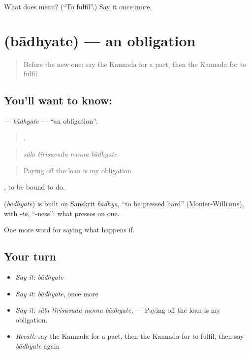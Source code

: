 \begin{tcolorbox}[breakable,colback=teal!4,colframe=teal!35!black,title={Before you move on}]
What does  mean? (\textquotedblleft{}To fulfil\textquotedblright{}.) Say it once more.
\end{tcolorbox}
\section[\texorpdfstring{\kn{ಬಾಧ್ಯತೆ} (bādhyate)}{ಬಾಧ್ಯತೆ (bādhyate)}]{ (bādhyate) — an obligation}

\label{lesson:KA-C411-badhyate}



\begin{quote}
Before the new one: say the Kannada for a pact, then the Kannada for to fulfil.
\end{quote}

\subsection*{You'll want to know: }
\textbf{} — \emph{bādhyate} — \textquotedblleft{}an obligation\textquotedblright{}.

\begin{quote}
   .
\end{quote}

\begin{quote}
\emph{sāla tīrisuvudu nanna bādhyate.}
\end{quote}

\begin{quote}
Paying off the loan is my obligation.
\end{quote}

 , to be bound to do.

\begin{cousinweb}
\textbf{} (\emph{bādhyate}) is built on Sanskrit \emph{bādhya}, \textquotedblleft{}to be pressed hard\textquotedblright{} (Monier-Williams), with -\emph{tā}, \textquotedblleft{}-ness\textquotedblright{}: what presses on one.
\end{cousinweb}

\begin{grammarlens}[title={What you've built}]
One more word for saying what happens if.
\end{grammarlens}

\subsection*{Your turn}
\begin{itemize}
\raggedright
  \item \emph{Say it:} \emph{bādhyate}
  \item \emph{Say it:} \emph{bādhyate}, once more
  \item \emph{Say it:} \emph{sāla tīrisuvudu nanna bādhyate.} — Paying off the loan is my obligation.
  \item \emph{Recall:} say the Kannada for a pact, then the Kannada for to fulfil, then say \emph{bādhyate} again
\end{itemize}


